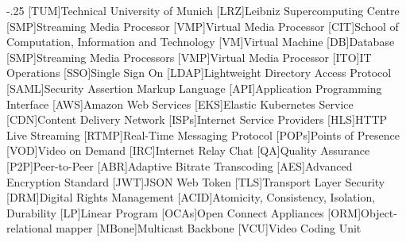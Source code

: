 \documentclass[headsepline,footsepline,footinclude=false,oneside,fontsize=11pt,paper=a4,listof=totoc,bibliography=totoc]{scrbook} %
\begin{document}


\frontmatter{}





\tableofcontents{}

\mainmatter{}






%





\appendix{}


\begin{acronym}
	\itemsep-.25\baselineskip
	[TUM]{Technical University of Munich}
	[LRZ]{Leibniz Supercomputing Centre}
	[SMP]{Streaming Media Processor}
	[VMP]{Virtual Media Processor}
	[CIT]{School of Computation, Information and Technology}
 	[VM]{Virtual Machine}
 	[DB]{Database}
 	[SMP]{Streaming Media Processors}
 	[VMP]{Virtual Media Processor}
 	[ITO]{IT Operations}
 	[SSO]{Single Sign On}
 	[LDAP]{Lightweight Directory Access Protocol}
 	[SAML]{Security Assertion Markup Language}
 	[API]{Application Programming Interface}
 	[AWS]{Amazon Web Services}
 	[EKS]{Elastic Kubernetes Service}
 	[CDN]{Content Delivery Network}
 	[ISPs]{Internet Service Providers}
 	[HLS]{HTTP Live Streaming}
 	[RTMP]{Real-Time Messaging Protocol}
 	[POPs]{Points of Presence}
 	[VOD]{Video on Demand}
 	[IRC]{Internet Relay Chat}
 	[QA]{Quality Assurance}
 	[P2P]{Peer-to-Peer}
 	[ABR]{Adaptive Bitrate Transcoding}
 	[AES]{Advanced Encryption Standard}
 	[JWT]{JSON Web Token}
 	[TLS]{Transport Layer Security}
 	[DRM]{Digital Rights Management}
 	[ACID]{Atomicity, Consistency, Isolation, Durability}
 	[LP]{Linear Program}
 	[OCAs]{Open Connect Appliances}
    [ORM]{Object-relational mapper}
 	[MBone]{Multicast Backbone}
    [VCU]{Video Coding Unit}
\end{acronym}

\listoffigures{}
\listoftables{}
\printbibliography{}
\end{document}

